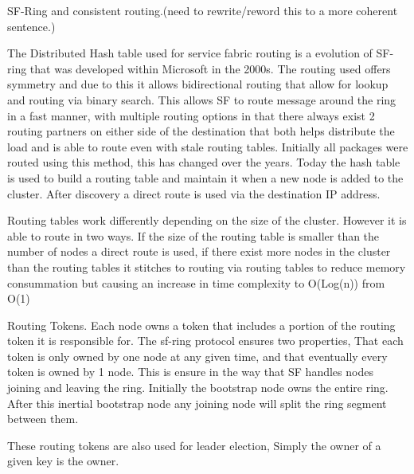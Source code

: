 \documentclass[a4paper,10pt,titlepage]{report}
\begin{document}
    SF-Ring and consistent routing.(need to rewrite/reword this to a more coherent sentence.)

    The Distributed Hash table used for service fabric routing is a evolution of SF-ring that was developed within Microsoft in the 2000s. The routing used offers symmetry and due to this it allows bidirectional routing that allow for lookup and routing via binary search. This allows SF to route message around the ring in a fast manner, with multiple routing options in that there always exist 2 routing partners on either side of the destination that both helps distribute the load and is able to route even with stale routing tables. Initially all packages were routed using this method, this has changed over the years. Today the hash table is used to build a routing table and maintain it when a new node is added to the cluster. After discovery a direct route is used via the destination IP address. \\
    \vspace{5mm}

    Routing tables work differently depending on the size of the cluster. However it is able to route in two ways. If the size of the routing table is smaller than the number of nodes a direct route is used, if there exist more nodes in the cluster than the routing tables it stitches to routing via routing tables to reduce memory consummation but causing an increase in time complexity to O(Log(n)) from O(1)\\
    \vspace{5mm}

    Routing Tokens.
    Each node owns a token that includes a portion of the routing token it is responsible for. The sf-ring protocol ensures two properties, That each token is only owned by one node at any given time, and that eventually every token is owned by 1 node. This is ensure in the way that SF handles nodes joining and leaving the ring. Initially the bootstrap node owns the entire ring. After this inertial bootstrap node any joining node will split the ring segment between them.\\
    \vspace{5mm}


    These routing tokens are also used for leader election, Simply the owner of a given key is the owner.
\end{document}
